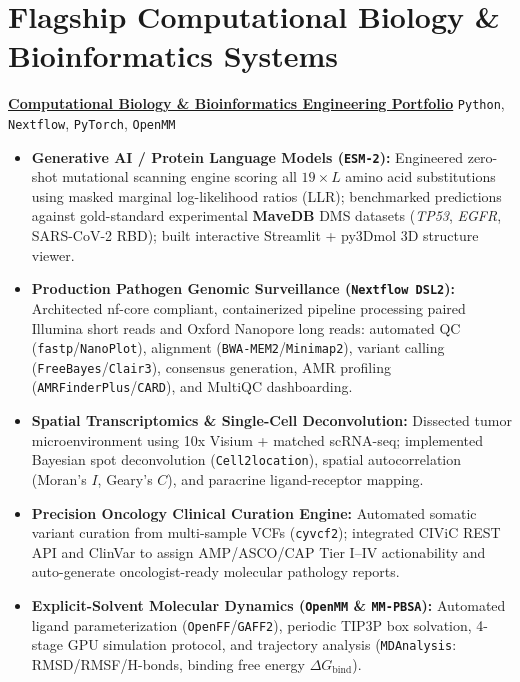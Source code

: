 \documentclass[10pt,letterpaper]{article}
\begin{document}
\section{Flagship Computational Biology \& Bioinformatics Systems}
\vspace{2pt}
\textbf{\href{https://github.com/aashiq-parinda/bioinformatics-portfolio}{\color{accent}Computational Biology \& Bioinformatics Engineering Portfolio}} \hfill \small{\texttt{Python}, \texttt{Nextflow}, \texttt{PyTorch}, \texttt{OpenMM}}
\begin{itemize}[leftmargin=*, nosep]
    \item \textbf{Generative AI / Protein Language Models (\texttt{ESM-2}):} Engineered zero-shot mutational scanning engine scoring all $19 \times L$ amino acid substitutions using masked marginal log-likelihood ratios (LLR); benchmarked predictions against gold-standard experimental \textbf{MaveDB} DMS datasets (\textit{TP53}, \textit{EGFR}, SARS-CoV-2 RBD); built interactive Streamlit + py3Dmol 3D structure viewer.
    \item \textbf{Production Pathogen Genomic Surveillance (\texttt{Nextflow DSL2}):} Architected nf-core compliant, containerized pipeline processing paired Illumina short reads and Oxford Nanopore long reads: automated QC (\texttt{fastp}/\texttt{NanoPlot}), alignment (\texttt{BWA-MEM2}/\texttt{Minimap2}), variant calling (\texttt{FreeBayes}/\texttt{Clair3}), consensus generation, AMR profiling (\texttt{AMRFinderPlus}/\texttt{CARD}), and MultiQC dashboarding.
    \item \textbf{Spatial Transcriptomics \& Single-Cell Deconvolution:} Dissected tumor microenvironment using 10x Visium + matched scRNA-seq; implemented Bayesian spot deconvolution (\texttt{Cell2location}), spatial autocorrelation (Moran's $I$, Geary's $C$), and paracrine ligand-receptor mapping.
    \item \textbf{Precision Oncology Clinical Curation Engine:} Automated somatic variant curation from multi-sample VCFs (\texttt{cyvcf2}); integrated CIViC REST API and ClinVar to assign AMP/ASCO/CAP Tier I--IV actionability and auto-generate oncologist-ready molecular pathology reports.
    \item \textbf{Explicit-Solvent Molecular Dynamics (\texttt{OpenMM} \& \texttt{MM-PBSA}):} Automated ligand parameterization (\texttt{OpenFF}/\texttt{GAFF2}), periodic TIP3P box solvation, 4-stage GPU simulation protocol, and trajectory analysis (\texttt{MDAnalysis}: RMSD/RMSF/H-bonds, binding free energy $\Delta G_{\text{bind}}$).
\end{itemize}
\vspace{-4pt}
\end{document}
